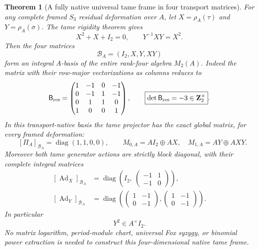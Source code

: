 \documentclass[11pt]{article}
\newtheorem{theorem}{Theorem}[section]
\theoremstyle{definition}
\begin{document}
\begin{theorem}[A fully native universal tame frame in four transport matrices]
\label{thm:dyadic-f131-native-tame-four-frame}
For any complete framed
$S_3$ residual deformation
over $A$, let
$X=\rho_A(\tau)$ and
$Y=\rho_A(\sigma)$.
The tame rigidity theorem
gives
\[
X^2+X+I_2=0,
\qquad Y^{-1}XY=X^2.
\]
Then the four matrices
\begin{equation}\label{eq:dyadic-f131-universal-native-frame}
\boxed{\qquad
\mathcal B_A=(I_2,X,Y,XY)
\qquad}
\end{equation}
form an \emph{integral
$A$-basis of the entire}
rank-four algebra
$M_2(A)$.
Indeed the matrix with
their row-major vectorizations
as columns reduces to
\begin{equation}\label{eq:dyadic-f131-native-frame-residue}
\mathsf B_{\rm res}=
\begin{pmatrix}
1&-1&0&-1\\
0&-1&1&-1\\
0&1&1&0\\
1&0&0&1
\end{pmatrix},
\qquad
\boxed{\det\mathsf B_{\rm res}=-3
\in\mathbf Z_2^\times}.
\end{equation}
In this \emph{transport-native}
basis the tame projector
has the exact global
matrix, for \emph{every}
framed deformation:
\begin{equation}\label{eq:dyadic-f131-universal-diagonal-projector}
\boxed{\qquad
[\Pi_A]_{\mathcal B_A}
=\operatorname{diag}(1,1,0,0),
\qquad
M_{0,A}=A I_2\oplus AX,
\quad
M_{1,A}=AY\oplus AXY.
\qquad}
\end{equation}
Moreover both tame
generator actions are
strictly block diagonal,
with their complete
integral matrices
\begin{equation}\label{eq:dyadic-f131-universal-block-actions}
\boxed{
\begin{aligned}
[\operatorname{Ad}_X]_{\mathcal B_A}
&=
\operatorname{diag}\left(
 I_2,\
 \begin{pmatrix}-1&1\\-1&0\end{pmatrix}
 \right),\\[2pt]
[\operatorname{Ad}_Y]_{\mathcal B_A}
&=
\operatorname{diag}\left(
 \begin{pmatrix}1&-1\\0&-1\end{pmatrix},
 \begin{pmatrix}1&-1\\0&-1\end{pmatrix}
 \right).
\end{aligned}}
\end{equation}
In particular
\begin{equation}\label{eq:dyadic-f131-frobenius-square-scalar}
\boxed{\qquad Y^2\in A^\times I_2. \qquad}
\end{equation}
No matrix logarithm,
period-module chart,
universal Fox syzygy,
or binomial power
extraction is needed
to construct this
four-dimensional
native tame frame.


\end{theorem}
\end{document}
